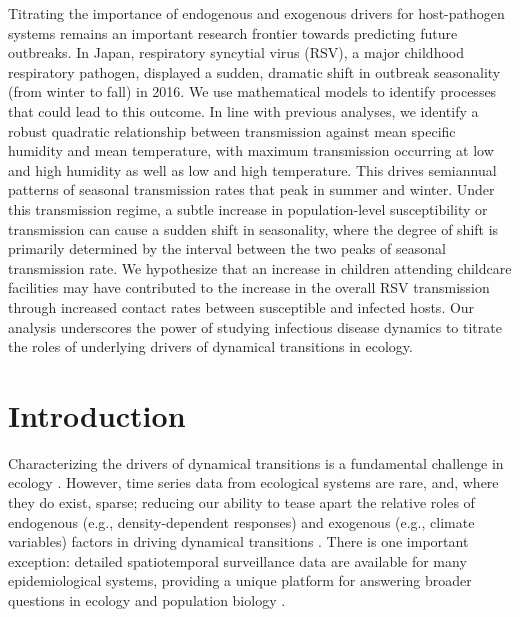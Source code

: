 \documentclass[12pt]{article}
\begin{document}
Titrating the importance of endogenous and exogenous drivers for host-pathogen systems remains an important research frontier towards predicting future outbreaks.
In Japan, respiratory syncytial virus (RSV), a major childhood respiratory pathogen, displayed a sudden, dramatic shift in outbreak seasonality (from winter to fall) in 2016. 
We use mathematical models to identify processes that could lead to this outcome.
In line with previous analyses, we identify a robust quadratic relationship between transmission against mean specific humidity and mean temperature, with maximum transmission occurring at low and high humidity as well as low and high temperature.
This drives semiannual patterns of seasonal transmission rates that peak in summer and winter.
Under this transmission regime, a subtle increase in population-level susceptibility or transmission can cause a sudden shift in seasonality, where the degree of shift is primarily determined by the interval between the two peaks of seasonal transmission rate.
We hypothesize that an increase in children attending childcare facilities may have contributed to the increase in the overall RSV transmission through increased contact rates between susceptible and infected hosts.
Our analysis underscores the power of studying infectious disease dynamics to titrate the roles of underlying drivers of dynamical transitions in ecology.

\pagebreak

\section*{Introduction}

Characterizing the drivers of dynamical transitions is a fundamental challenge in ecology \citep{earn2000simple,hastings2004transients,hastings2018transient}.
However, time series data from ecological systems are rare, and, where they do exist, sparse; reducing our ability to tease apart the relative roles of endogenous (e.g., density-dependent responses) and exogenous (e.g., climate variables) factors in driving dynamical transitions \citep{hunter1998cycles,lundberg2000population,hernandez2012fluctuations}.
There is one important exception: detailed spatiotemporal surveillance data are available for many epidemiological systems, providing a unique platform for answering broader questions in ecology and population biology \citep{levin1997mathematical,anderson1991infectious,grenfell2001travelling,he2010plug}.
\end{document}
